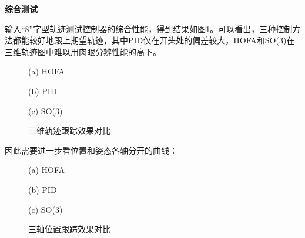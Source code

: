\textbf{综合测试}


  输入“8”字型轨迹测试控制器的综合性能，得到结果如图\ref{matlab_3d}。可以看出，三种控制方法都能较好地跟上期望轨迹，其中PID仅在开头处的偏差较大，HOFA和SO(3)在三维轨迹图中难以用肉眼分辨性能的高下。

  \newpage
  
  \begin{figure}[h]
      \centering
      \begin{minipage}[t]{0.33\textwidth}
        \centering
        \caption*{(a) HOFA}
      \end{minipage}\hfill
      \begin{minipage}[t]{0.33\textwidth}
        \centering
        \caption*{(b) PID}
      \end{minipage}\hfill
      \begin{minipage}[t]{0.33\textwidth}
        \centering
        \caption*{(c) SO(3)}
      \end{minipage}
      \caption{三维轨迹跟踪效果对比}
      \label{matlab_3d}
  \end{figure}
 
  因此需要进一步看位置和姿态各轴分开的曲线：

  \begin{figure}[h]
    \centering
    \begin{minipage}[t]{0.33\textwidth}
      \centering
      \caption*{(a) HOFA}
    \end{minipage}\hfill
    \begin{minipage}[t]{0.33\textwidth}
      \centering
      \caption*{(b) PID}
    \end{minipage}\hfill
    \begin{minipage}[t]{0.33\textwidth}
      \centering
      \caption*{(c) SO(3)}
    \end{minipage}
    \caption{三轴位置跟踪效果对比}
    \label{matlab_x}
\end{figure}

